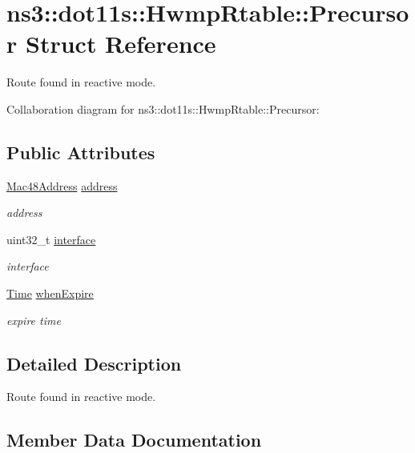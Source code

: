 \hypertarget{structns3_1_1dot11s_1_1HwmpRtable_1_1Precursor}{}\section{ns3\+:\+:dot11s\+:\+:Hwmp\+Rtable\+:\+:Precursor Struct Reference}
\label{structns3_1_1dot11s_1_1HwmpRtable_1_1Precursor}


Route found in reactive mode.  




Collaboration diagram for ns3\+:\+:dot11s\+:\+:Hwmp\+Rtable\+:\+:Precursor\+:
\subsection*{Public Attributes}
\begin{DoxyCompactItemize}
\item 
\hyperlink{classns3_1_1Mac48Address}{Mac48\+Address} \hyperlink{structns3_1_1dot11s_1_1HwmpRtable_1_1Precursor_a0ec2e16be8a1a862e6f97b208639bbb5}{address}
\begin{DoxyCompactList}\small\item\em address \end{DoxyCompactList}\item 
uint32\+\_\+t \hyperlink{structns3_1_1dot11s_1_1HwmpRtable_1_1Precursor_a560f4db1dedcbb331fd1442035d7caba}{interface}
\begin{DoxyCompactList}\small\item\em interface \end{DoxyCompactList}\item 
\hyperlink{classns3_1_1Time}{Time} \hyperlink{structns3_1_1dot11s_1_1HwmpRtable_1_1Precursor_a69b4a8e5aac52921a0a41b1e0756848e}{when\+Expire}
\begin{DoxyCompactList}\small\item\em expire time \end{DoxyCompactList}\end{DoxyCompactItemize}


\subsection{Detailed Description}
Route found in reactive mode. 

\subsection{Member Data Documentation}
